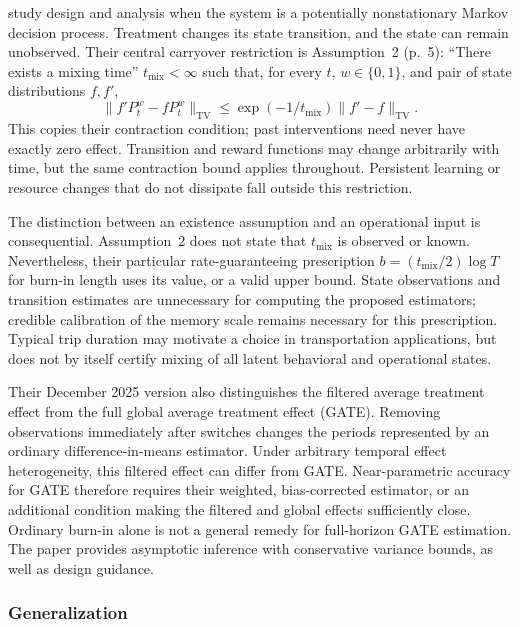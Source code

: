 \documentclass[12pt]{article}
\begin{document}
\citet{huwager2025} study design and analysis when the system is a potentially nonstationary Markov decision process. Treatment changes its state transition, and the state can remain unobserved. Their central carryover restriction is Assumption~2 (p.~5): ``There exists a mixing time'' $t_{\mathrm{mix}}<\infty$ such that, for every $t$, $w\in\{0,1\}$, and pair of state distributions $f,f'$,
\begin{equation}
\label{eq:hw-mixing}
 \lVert f'P_t^w-fP_t^w\rVert_{\mathrm{TV}}
 \leq \exp(-1/t_{\mathrm{mix}})\lVert f'-f\rVert_{\mathrm{TV}}.
\end{equation}
This copies their contraction condition; past interventions need never have exactly zero effect. Transition and reward functions may change arbitrarily with time, but the same contraction bound applies throughout. Persistent learning or resource changes that do not dissipate fall outside this restriction.

The distinction between an existence assumption and an operational input is consequential. Assumption~2 does not state that $t_{\mathrm{mix}}$ is observed or known. Nevertheless, their particular rate-guaranteeing prescription $b=(t_{\mathrm{mix}}/2)\log T$ for burn-in length uses its value, or a valid upper bound. State observations and transition estimates are unnecessary for computing the proposed estimators; credible calibration of the memory scale remains necessary for this prescription. Typical trip duration may motivate a choice in transportation applications, but does not by itself certify mixing of all latent behavioral and operational states.

Their December 2025 version also distinguishes the filtered average treatment effect from the full global average treatment effect (GATE). Removing observations immediately after switches changes the periods represented by an ordinary difference-in-means estimator. Under arbitrary temporal effect heterogeneity, this filtered effect can differ from GATE. Near-parametric accuracy for GATE therefore requires their weighted, bias-corrected estimator, or an additional condition making the filtered and global effects sufficiently close. Ordinary burn-in alone is not a general remedy for full-horizon GATE estimation. The paper provides asymptotic inference with conservative variance bounds, as well as design guidance.

\subsubsection{Generalization}
\end{document}
